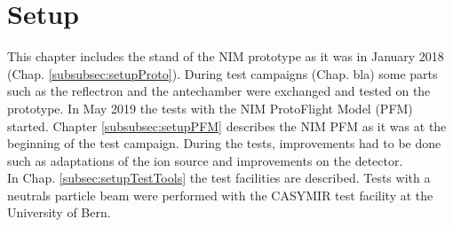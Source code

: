 \section{Setup}\label{sec:setup}

	This chapter includes the stand of the NIM prototype as it was in January 2018 (Chap. \ref{subsubsec:setupProto}). During test campaigns (Chap. bla) some parts such as the reflectron and the antechamber were exchanged and tested on the prototype. In May 2019 the tests with the NIM ProtoFlight Model (PFM) started. Chapter \ref{subsubsec:setupPFM} describes the NIM PFM as it was at the beginning of the test campaign. During the tests, improvements had to be done such as adaptations of the ion source and improvements on the detector.\\
	In Chap. \ref{subsec:setupTestTools} the test facilities are described. Tests with a neutrals particle beam were performed with the CASYMIR test facility at the University of Bern. %
		

	
